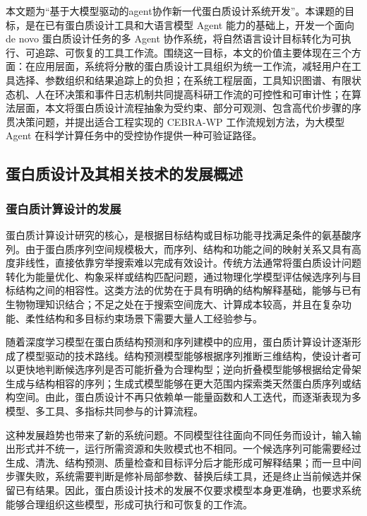 本文题为``基于大模型驱动的agent协作新一代蛋白质设计系统开发''。本课题的目标，是在已有蛋白质设计工具和大语言模型
Agent 能力的基础上，开发一个面向 de novo 蛋白质设计任务的多 Agent
协作系统，将自然语言设计目标转化为可执行、可追踪、可恢复的工具工作流。围绕这一目标，本文的价值主要体现在三个方面：在应用层面，系统将分散的蛋白质设计工具组织为统一工作流，减轻用户在工具选择、参数组织和结果追踪上的负担；在系统工程层面，工具知识图谱、有限状态机、人在环决策和事件日志机制共同提高科研工作流的可控性和可审计性；在算法层面，本文将蛋白质设计流程抽象为受约束、部分可观测、包含高代价步骤的序贯决策问题，并提出适合工程实现的
CEBRA-WP 工作流规划方法，为大模型 Agent
在科学计算任务中的受控协作提供一种可验证路径。

\subsection{蛋白质设计及其相关技术的发展概述}\label{ux86cbux767dux8d28ux8bbeux8ba1ux53caux5176ux76f8ux5173ux6280ux672fux7684ux53d1ux5c55ux6982ux8ff0}

\subsubsection{蛋白质计算设计的发展}\label{ux86cbux767dux8d28ux8ba1ux7b97ux8bbeux8ba1ux7684ux53d1ux5c55}

蛋白质计算设计研究的核心，是根据目标结构或目标功能寻找满足条件的氨基酸序列。由于蛋白质序列空间规模极大，而序列、结构和功能之间的映射关系又具有高度非线性，直接依靠穷举搜索难以完成有效设计。传统方法通常将蛋白质设计问题转化为能量优化、构象采样或结构匹配问题，通过物理化学模型评估候选序列与目标结构之间的相容性。这类方法的优势在于具有明确的结构解释基础，能够与已有生物物理知识结合；不足之处在于搜索空间庞大、计算成本较高，并且在复杂功能、柔性结构和多目标约束场景下需要大量人工经验参与。

随着深度学习模型在蛋白质结构预测和序列建模中的应用，蛋白质计算设计逐渐形成了模型驱动的技术路线。结构预测模型能够根据序列推断三维结构，使设计者可以更快地判断候选序列是否可能折叠为合理构型；逆向折叠模型能够根据给定骨架生成与结构相容的序列；生成式模型能够在更大范围内探索类天然蛋白质序列或结构空间。由此，蛋白质设计不再只依赖单一能量函数和人工迭代，而逐渐表现为多模型、多工具、多指标共同参与的计算流程。

这种发展趋势也带来了新的系统问题。不同模型往往面向不同任务而设计，输入输出形式并不统一，运行所需资源和失败模式也不相同。一个候选序列可能需要经过生成、清洗、结构预测、质量检查和目标评分后才能形成可解释结果；而一旦中间步骤失败，系统需要判断是修补局部参数、替换后续工具，还是终止当前候选并保留已有结果。因此，蛋白质设计技术的发展不仅要求模型本身更准确，也要求系统能够合理组织这些模型，形成可执行和可恢复的工作流。

